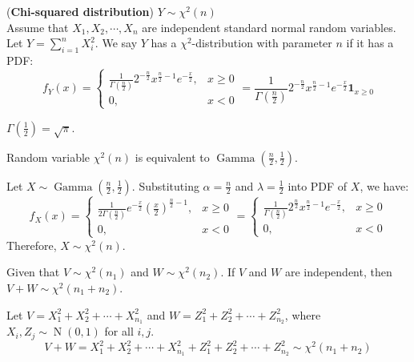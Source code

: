 \documentclass{huhtakm-template-book}
\DeclareMathOperator{\N}{N}
\DeclareMathOperator{\Gam}{Gamma}
\begin{document}
\begin{eg}(\textbf{Chi-squared distribution}) $Y\sim\chi^{2}(n)$\\
	Assume that $X_{1},X_{2},\cdots,X_{n}$ are independent standard normal random variables. Let $Y=\sum_{i=1}^{n}X_{i}^{2}$. We say $Y$ has a $\chi^{2}$-distribution with parameter $n$ if it has a PDF:
	\begin{equation*}
		f_{Y}(x)=\begin{cases}
			\frac{1}{\Gamma(\frac{n}{2})}2^{-\frac{n}{2}}x^{\frac{n}{2}-1}e^{-\frac{x}{2}}, &x\geq 0\\
			0, &x<0
		\end{cases}=\frac{1}{\Gamma(\frac{n}{2})}2^{-\frac{n}{2}}x^{\frac{n}{2}-1}e^{-\frac{x}{2}}\mathbf{1}_{x\geq 0}
	\end{equation*}
\end{eg}
\begin{rem}
	$\Gamma(\frac{1}{2})=\sqrt{\pi}$.
\end{rem}
\begin{lem}
	Random variable $\chi^{2}(n)$ is equivalent to $\Gam(\frac{n}{2},\frac{1}{2})$.
\end{lem}
\begin{proofing}
	Let $X\sim\Gam(\frac{n}{2},\frac{1}{2})$. Substituting $\alpha=\frac{n}{2}$ and $\lambda=\frac{1}{2}$ into PDF of $X$, we have:
	\begin{equation*}
		f_{X}(x)=\begin{cases}
			\frac{1}{2\Gamma(\frac{n}{2})}e^{-\frac{x}{2}}\left(\frac{x}{2}\right)^{\frac{n}{2}-1}, &x\geq 0\\
			0, &x<0
		\end{cases}=\begin{cases}
		\frac{1}{\Gamma(\frac{n}{2})}2^{\frac{n}{2}}x^{\frac{n}{2}-1}e^{-\frac{x}{2}}, &x\geq 0\\
		0, &x<0
		\end{cases}
	\end{equation*}
	Therefore, $X\sim\chi^{2}(n)$.
\end{proofing}
\begin{lem}
	\label{Chapter 5 (Lemma) Additivity of chi-squared distribution}
	Given that $V\sim\chi^{2}(n_{1})$ and $W\sim\chi^{2}(n_{2})$. If $V$ and $W$ are independent, then $V+W\sim\chi^{2}(n_{1}+n_{2})$.
\end{lem}
\begin{proofing}
	Let $V=X_{1}^{2}+X_{2}^{2}+\cdots+X_{n_{1}}^{2}$ and $W=Z_{1}^{2}+Z_{2}^{2}+\cdots+Z_{n_{2}}^{2}$, where $X_{i},Z_{j}\sim\N(0,1)$ for all $i,j$.
	\begin{equation*}
		V+W=X_{1}^{2}+X_{2}^{2}+\cdots+X_{n_{1}}^{2}+Z_{1}^{2}+Z_{2}^{2}+\cdots+Z_{n_{2}}^{2}\sim\chi^{2}(n_{1}+n_{2})
	\end{equation*}
\end{proofing}
\end{document}

